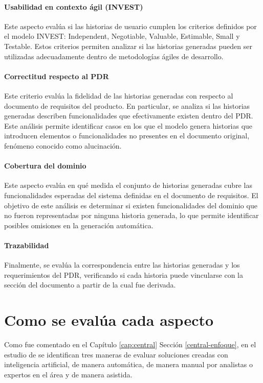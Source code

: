 \paragraph{Usabilidad en contexto ágil (INVEST)}
Este aspecto evalúa si las historias de usuario cumplen los criterios definidos por el modelo INVEST: Independent, Negotiable, Valuable, Estimable, Small y Testable. Estos criterios permiten analizar si las historias generadas pueden ser utilizadas adecuadamente dentro de metodologías ágiles de desarrollo.
\paragraph{Correctitud respecto al PDR}
Este criterio evalúa la fidelidad de las historias generadas con respecto al documento de requisitos del producto. En particular, se analiza si las historias generadas describen funcionalidades que efectivamente existen dentro del PDR. Este análisis permite identificar casos en los que el modelo genera historias que introducen elementos o funcionalidades no presentes en el documento original, fenómeno conocido como alucinación.
\paragraph{Cobertura del dominio}
Este aspecto evalúa en qué medida el conjunto de historias generadas cubre las funcionalidades esperadas del sistema definidas en el documento de requisitos. El objetivo de este análisis es determinar si existen funcionalidades del dominio que no fueron representadas por ninguna historia generada, lo que permite identificar posibles omisiones en la generación automática.
\paragraph{Trazabilidad}
Finalmente, se evalúa la correspondencia entre las historias generadas y los requerimientos del PDR, verificando si cada historia puede vincularse con la sección del documento a partir de la cual fue derivada.

\section{Como se evalúa cada aspecto}
Como fue comentado en el Capítulo \ref{cap:central} Sección \ref{central-enfoque}, en el estudio de \cite{yu2026evaluating_genai_quality_multicase} se identifican tres maneras de evaluar soluciones creadas con inteligencia artificial, de manera automática, de manera manual por analistas o expertos en el área y de manera asistida.


